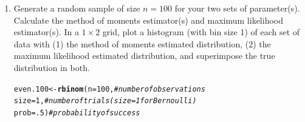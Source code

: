 \documentclass{article}\usepackage[]{graphicx}\usepackage[]{color}
\makeatletter
\newcommand{\hlnum}[1]{\textcolor[rgb]{0.686,0.059,0.569}{#1}}%
\newcommand{\hlcom}[1]{\textcolor[rgb]{0.678,0.584,0.686}{\textit{#1}}}%
\newcommand{\hlstd}[1]{\textcolor[rgb]{0.345,0.345,0.345}{#1}}%
\newcommand{\hlkwb}[1]{\textcolor[rgb]{0.69,0.353,0.396}{#1}}%
\newcommand{\hlkwc}[1]{\textcolor[rgb]{0.333,0.667,0.333}{#1}}%
\newcommand{\hlkwd}[1]{\textcolor[rgb]{0.737,0.353,0.396}{\textbf{#1}}}%
\newenvironment{kframe}{%
 \def\at@end@of@kframe{}%
 \ifinner\ifhmode%
  \def\at@end@of@kframe{\end{minipage}}%
  \begin{minipage}{\columnwidth}%
 \fi\fi%
 \def\FrameCommand##1{\hskip\@totalleftmargin \hskip-\fboxsep
 \colorbox{shadecolor}{##1}\hskip-\fboxsep
     \hskip-\linewidth \hskip-\@totalleftmargin \hskip\columnwidth}%
 \MakeFramed {\advance\hsize-\width
   \@totalleftmargin\z@ \linewidth\hsize
   \@setminipage}}%
 {\par\unskip\endMakeFramed%
 \at@end@of@kframe}
\newenvironment{knitrout}{}{} %
\makeatother
\begin{document}
\begin{enumerate}
\begin{enumerate}
  \item Generate a random sample of size $n=100$ for your two sets of parameter(s).
  Calculate the method of moments estimator(s) and maximum likelihood estimator(s). 
  In a $1 \times 2$ grid, plot a histogram (with bin size 1) of each set of data 
  with (1) the method of moments estimated distribution, (2) the maximum likelihood
  estimated distribution, and superimpose the true distribution in both.
\begin{knitrout}
\color{fgcolor}\begin{kframe}
\begin{alltt}
\hlstd{even.100} \hlkwb{<-} \hlkwd{rbinom}\hlstd{(}\hlkwc{n}\hlstd{=}\hlnum{100}\hlstd{,}        \hlcom{#number of observations}
                  \hlkwc{size}\hlstd{=}\hlnum{1}\hlstd{,}        \hlcom{#number of trials (size=1 for Bernoulli)}
                  \hlkwc{prob}\hlstd{=}\hlnum{.5}\hlstd{)}       \hlcom{#probability of success}


\end{alltt}
\end{kframe}
\end{knitrout}
\end{enumerate}
\end{enumerate}
\end{document}
